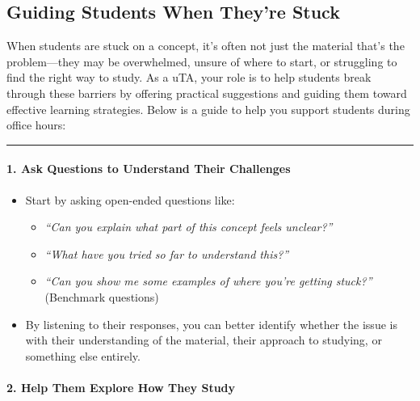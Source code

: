 \documentclass[
]{article}
\providecommand{\tightlist}{%
  \setlength{\itemsep}{0pt}\setlength{\parskip}{0pt}}
\begin{document}
\hypertarget{guiding-students-when-theyre-stuck}{%
\subsection*{Guiding Students When They're Stuck}\label{guiding-students-when-theyre-stuck}}

When students are stuck on a concept, it's often not just the material that's the problem---they may be overwhelmed, unsure of where to start, or struggling to find the right way to study. As a uTA, your role is to help students break through these barriers by offering practical suggestions and guiding them toward effective learning strategies. Below is a guide to help you support students during office hours:

\begin{center}\rule{0.5\linewidth}{0.5pt}\end{center}

\hypertarget{ask-questions-to-understand-their-challenges}{%
\paragraph*{1. Ask Questions to Understand Their Challenges}\label{ask-questions-to-understand-their-challenges}}

\begin{itemize}
\tightlist
\item
  Start by asking open-ended questions like:

  \begin{itemize}
  \tightlist
  \item
    \emph{``Can you explain what part of this concept feels unclear?''}
  \item
    \emph{``What have you tried so far to understand this?''}
  \item
    \emph{``Can you show me some examples of where you're getting stuck?''} (Benchmark questions)
  \end{itemize}
\item
  By listening to their responses, you can better identify whether the issue is with their understanding of the material, their approach to studying, or something else entirely.
\end{itemize}

\hypertarget{help-them-explore-how-they-study}{%
\paragraph*{2. Help Them Explore How They Study}\label{help-them-explore-how-they-study}}
\end{document}

